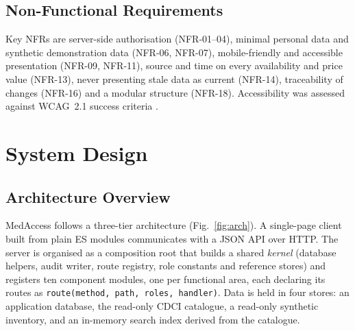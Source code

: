 \documentclass[11pt,a4paper]{article}
\begin{document}
\subsection{Non-Functional Requirements}
Key NFRs are server-side authorisation (NFR-01--04), minimal personal data and synthetic demonstration data (NFR-06, NFR-07), mobile-friendly and accessible presentation (NFR-09, NFR-11), source and time on every availability and price value (NFR-13), never presenting stale data as current (NFR-14), traceability of changes (NFR-16) and a modular structure (NFR-18). Accessibility was assessed against WCAG~2.1 success criteria \cite{wcag21}.

\section{System Design}\label{ch:design}

\subsection{Architecture Overview}
MedAccess follows a three-tier architecture (Fig.~\ref{fig:arch}). A single-page client built from plain ES modules communicates with a JSON API over HTTP. The server is organised as a composition root that builds a shared \emph{kernel} (database helpers, audit writer, route registry, role constants and reference stores) and registers ten component modules, one per functional area, each declaring its routes as \texttt{route(method, path, roles, handler)}. Data is held in four stores: an application database, the read-only CDCI catalogue, a read-only synthetic inventory, and an in-memory search index derived from the catalogue.
\end{document}
